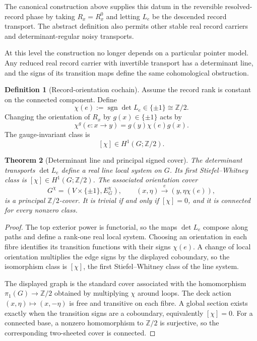 \documentclass[11pt]{article}
\newtheorem{theorem}{Theorem}[section]
\theoremstyle{definition}
\newtheorem{definition}[theorem]{Definition}
\theoremstyle{remark}
\newcommand{\sgn}{\operatorname{sgn}}
\newcommand{\Ztwo}{\mathbb Z/2}
\begin{document}
The canonical construction above supplies this datum in the reversible
resolved-record phase by taking $R_x=R_x^0$ and letting $L_e$ be the descended
record transport.  The abstract definition also permits other stable real
record carriers and determinant-regular noisy transports.

At this level the construction no longer depends on a particular pointer model.
Any reduced real record carrier with invertible transport has a determinant line,
and the signs of its transition maps define the same cohomological obstruction.

\begin{definition}[Record-orientation cochain]
\label{def:orientation-cochain}
Assume the record rank is constant on the connected component.  Define
\[
 \chi(e):=\sgn\det L_e\in\{\pm1\}\cong\Ztwo.
\]
Changing the orientation of $R_x$ by $g(x)\in\{\pm1\}$ acts by
\[
 \chi^g(e:x\to y)=g(y)\chi(e)g(x).
\]
The gauge-invariant class is
\[
 [\chi]\in H^1(G;\Ztwo).
\]
\end{definition}

\begin{theorem}[Determinant line and principal signed cover]
\label{thm:determinant-cover}
The determinant transports $\det L_e$ define a real line local system on $G$.
Its first Stiefel--Whitney class is $[\chi]\in H^1(G;\Ztwo)$.  The associated
orientation cover
\[
 G^\chi=(V\times\{\pm1\},E_G^\chi),
 \qquad
 (x,\eta)\xrightarrow{e}(y,\eta\chi(e)),
\]
is a principal $\Ztwo$-cover.  It is trivial if and only if $[\chi]=0$, and it
is connected for every nonzero class.
\end{theorem}

\begin{proof}
The top exterior power is functorial, so the maps $\det L_e$ compose along
paths and define a rank-one real local system.  Choosing an orientation in
each fibre identifies its transition functions with their signs $\chi(e)$.
A change of local orientation multiplies the edge signs by the displayed
coboundary, so the isomorphism class is $[\chi]$, the first
Stiefel--Whitney class of the line system.

The displayed graph is the standard cover associated with the homomorphism
$\pi_1(G)\to\Ztwo$ obtained by multiplying $\chi$ around loops.  The deck action
$(x,\eta)\mapsto(x,-\eta)$ is free and transitive on each fibre.  A global
section exists exactly when the transition signs are a coboundary, equivalently
$[\chi]=0$.  For a connected base, a nonzero homomorphism to $\Ztwo$ is
surjective, so the corresponding two-sheeted cover is connected.
\end{proof}
\end{document}
